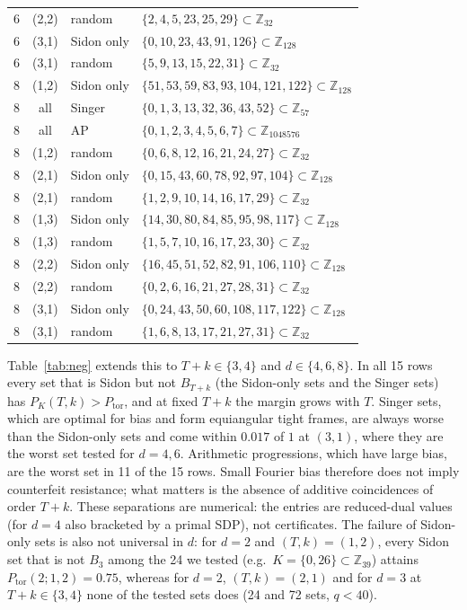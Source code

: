 \documentclass[11pt]{article}
\newcommand{\Z}{\mathbb{Z}}
\newcommand{\Ptor}{P_{\mathrm{tor}}}
\theoremstyle{definition}
\theoremstyle{remark}
\begin{document}
\begin{table}[tbp]
\begin{tabular}{cc ll}
6 & (2,2) & random & $\{2,4,5,23,25,29\}\subset\Z_{32}$\\
6 & (3,1) & Sidon only & $\{0,10,23,43,91,126\}\subset\Z_{128}$\\
6 & (3,1) & random & $\{5,9,13,15,22,31\}\subset\Z_{32}$\\
\midrule
8 & (1,2) & Sidon only & $\{51,53,59,83,93,104,121,122\}\subset\Z_{128}$\\
8 & all & Singer & $\{0,1,3,13,32,36,43,52\}\subset\Z_{57}$\\
8 & all & AP & $\{0,1,2,3,4,5,6,7\}\subset\Z_{1048576}$\\
8 & (1,2) & random & $\{0,6,8,12,16,21,24,27\}\subset\Z_{32}$\\
8 & (2,1) & Sidon only & $\{0,15,43,60,78,92,97,104\}\subset\Z_{128}$\\
8 & (2,1) & random & $\{1,2,9,10,14,16,17,29\}\subset\Z_{32}$\\
8 & (1,3) & Sidon only & $\{14,30,80,84,85,95,98,117\}\subset\Z_{128}$\\
8 & (1,3) & random & $\{1,5,7,10,16,17,23,30\}\subset\Z_{32}$\\
8 & (2,2) & Sidon only & $\{16,45,51,52,82,91,106,110\}\subset\Z_{128}$\\
8 & (2,2) & random & $\{0,2,6,16,21,27,28,31\}\subset\Z_{32}$\\
8 & (3,1) & Sidon only & $\{0,24,43,50,60,108,117,122\}\subset\Z_{128}$\\
8 & (3,1) & random & $\{1,6,8,13,17,21,27,31\}\subset\Z_{32}$\\
\bottomrule\end{tabular}
\end{table}

Table~\ref{tab:neg} extends this to $T+k\in\{3,4\}$ and $d\in\{4,6,8\}$. In all 15 rows every set that is Sidon but not $B_{T+k}$
(the Sidon-only sets and the Singer sets) has $P_K(T,k)>\Ptor$, and at fixed $T+k$ the margin grows with $T$. Singer sets, which are optimal
for bias and form equiangular tight frames, are always worse than the Sidon-only sets and come within $0.017$ of $1$ at $(3,1)$,
where they are the worst set tested for $d=4,6$. Arithmetic progressions, which have large bias, are the worst set in 11 of the
15 rows. Small Fourier bias therefore does not imply counterfeit resistance; what matters is the absence of
additive coincidences of order $T+k$.
These separations are numerical: the entries are reduced-dual values (for $d=4$ also bracketed by a primal SDP), not certificates.
The failure of Sidon-only sets is also not universal in $d$: for $d=2$ and $(T,k)=(1,2)$, every Sidon set that is not $B_3$ among the
24 we tested (e.g.\ $K=\{0,26\}\subset\Z_{39}$) attains $\Ptor(2;1,2)=0.75$, whereas for $d=2$, $(T,k)=(2,1)$ and for $d=3$ at
$T+k\in\{3,4\}$ none of the tested sets does (24 and 72 sets, $q<40$).
\end{document}
